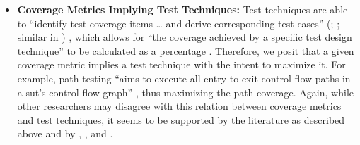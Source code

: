 \begin{itemize}
    \item {}\label{cov-test}
          \textbf{Coverage Metrics Implying Test Techniques:}
          Test techniques are able to ``identify test coverage items \dots{} and
          derive corresponding test cases'' (\citealp[p.~11]{IEEE2022};
          \citeyear[p.~5]{IEEE2021a}; similar in \citeyear[p.~467]{IEEE2017})%
          , which allows for ``the coverage achieved by a specific test design
          technique'' to be calculated as a percentage %
          \citeyearpar[p.~30]{IEEE2021c}. %
          Therefore, we posit that a given coverage metric implies a test
          technique with the intent to maximize it. For example, path testing
          ``aims to execute all entry-to-exit control flow paths in a
          \acs{sut}'s control flow graph'' \citep[p.~5\=/13]{SWEBOK2025},
          thus maximizing the path coverage. Again, while other
          researchers may disagree with this relation between coverage
          metrics and test techniques, it seems to be supported by the
          literature as described above and by
          \citet[pp.~183\==185]{DoğanEtAl2014},
          \citet[Fig.~1]{SharmaEtAl2021}, and \citet[pp.~2\==3]{Reid1996}%
          .
\end{itemize}

\clearpage

